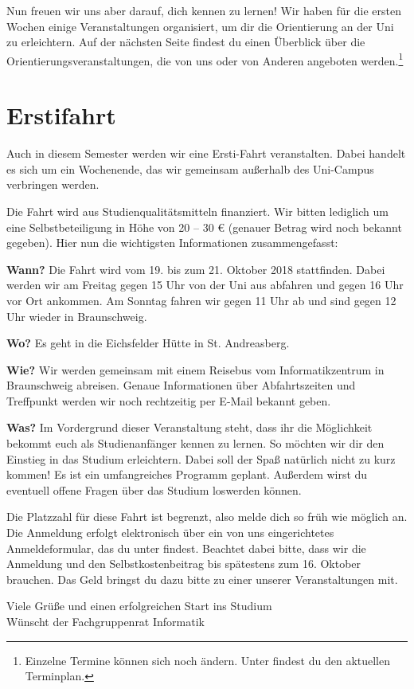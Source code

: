 \documentclass[
  a4paper,              %
  style=screen,
  nexus,                %
]{tubsartcl}
\begin{document}
\begin{multicols}{2}
Nun freuen wir uns aber darauf, dich kennen zu lernen! Wir haben für die ersten Wochen einige Veranstaltungen organisiert, um dir die Orientierung an der Uni zu erleichtern. Auf der nächsten Seite findest du einen Überblick über die Orientierungsveranstaltungen, die von uns oder von Anderen angeboten werden.\footnote{Einzelne Termine können sich noch ändern. Unter  findest du den aktuellen Terminplan.}

\section*{Erstifahrt}

Auch in diesem Semester werden wir eine Ersti-Fahrt veranstalten. Dabei handelt es sich um ein Wochenende, das wir gemeinsam außerhalb des Uni-Campus verbringen werden. 

Die Fahrt wird aus Studienqualitätsmitteln finanziert. Wir bitten lediglich um eine Selbstbeteiligung in Höhe von 20 – 30 \euro{} (genauer Betrag wird noch bekannt gegeben). Hier nun die wichtigsten Informationen zusammengefasst:

\textbf{Wann?} Die Fahrt wird vom  19. bis zum 21. Oktober 2018 stattfinden. Dabei werden wir am Freitag gegen 15 Uhr von der Uni aus abfahren und gegen 16 Uhr vor Ort ankommen. Am Sonntag fahren wir gegen 11 Uhr ab und sind gegen 12 Uhr wieder in Braunschweig.

\textbf{Wo?} Es geht in die Eichsfelder Hütte in St. Andreasberg.

\textbf{Wie?} Wir werden gemeinsam mit einem Reisebus vom Informatikzentrum in Braunschweig abreisen. Genaue Informationen über Abfahrtszeiten und Treffpunkt werden wir noch rechtzeitig per E-Mail bekannt geben.

\textbf{Was?} Im Vordergrund dieser Veranstaltung steht, dass ihr die Möglichkeit bekommt euch als Studienanfänger kennen zu lernen. So möchten wir dir den Einstieg in das Studium erleichtern. Dabei soll der Spaß natürlich nicht zu kurz kommen! Es ist ein umfangreiches Programm geplant. Außerdem wirst du eventuell offene Fragen über das Studium loswerden können.

Die Platzzahl für diese Fahrt ist begrenzt, also melde dich so früh wie möglich an. Die Anmeldung erfolgt elektronisch über ein von uns eingerichtetes Anmeldeformular, das du unter  findest. Beachtet dabei bitte, dass wir die Anmeldung und den Selbstkostenbeitrag bis spätestens zum 16. Oktober brauchen. Das Geld bringst du dazu bitte zu einer unserer Veranstaltungen mit. 

\end{multicols}

\noindent{}Viele Grüße und einen erfolgreichen Start ins Studium \\
Wünscht der Fachgruppenrat Informatik


\end{document}
